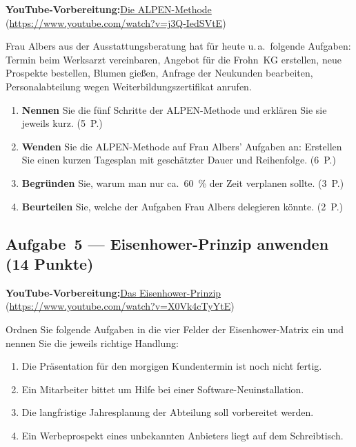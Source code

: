 \documentclass[11pt, a4paper]{article}
\begin{document}
\noindent\textbf{\color{bfwAccent}YouTube-Vorbereitung:}\enspace \href{https://www.youtube.com/watch?v=j3Q-IedSVtE}{Die ALPEN-Methode} (\url{https://www.youtube.com/watch?v=j3Q-IedSVtE})

\medskip
Frau Albers aus der Ausstattungsberatung hat für heute u.\,a.\ folgende Aufgaben: Termin
beim Werksarzt vereinbaren, Angebot für die Frohn~KG erstellen, neue Prospekte bestellen,
Blumen gießen, Anfrage der Neukunden bearbeiten, Personalabteilung wegen
Weiterbildungszertifikat anrufen.

\begin{enumerate}[label=(\alph*)]
  \item \textbf{Nennen} Sie die fünf Schritte der ALPEN-Methode und erklären Sie sie jeweils kurz. \hfill (5~P.)
  \item \textbf{Wenden} Sie die ALPEN-Methode auf Frau Albers' Aufgaben an: Erstellen Sie einen kurzen Tagesplan mit geschätzter Dauer und Reihenfolge. \hfill (6~P.)
  \item \textbf{Begründen} Sie, warum man nur ca.\ 60~\% der Zeit verplanen sollte. \hfill (3~P.)
  \item \textbf{Beurteilen} Sie, welche der Aufgaben Frau Albers delegieren könnte. \hfill (2~P.)
\end{enumerate}

\subsection*{Aufgabe~5 --- Eisenhower-Prinzip anwenden (14 Punkte)}

\noindent\textbf{\color{bfwAccent}YouTube-Vorbereitung:}\enspace \href{https://www.youtube.com/watch?v=X0Vk4cTyYtE}{Das Eisenhower-Prinzip} (\url{https://www.youtube.com/watch?v=X0Vk4cTyYtE})

\medskip
Ordnen Sie folgende Aufgaben in die vier Felder der Eisenhower-Matrix ein und nennen Sie
die jeweils richtige Handlung:
\begin{enumerate}[label=\arabic*., leftmargin=*]
  \item Die Präsentation für den morgigen Kundentermin ist noch nicht fertig.
  \item Ein Mitarbeiter bittet um Hilfe bei einer Software-Neuinstallation.
  \item Die langfristige Jahresplanung der Abteilung soll vorbereitet werden.
  \item Ein Werbeprospekt eines unbekannten Anbieters liegt auf dem Schreibtisch.
\end{enumerate}
\end{document}
